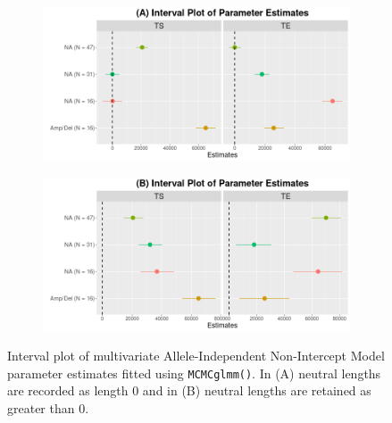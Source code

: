 \begin{figure}[!htb]
\vspace{0.5cm}
     \begin{subfigure}[t]{.49\textwidth}
      \centering
      \includegraphics[width = 1\textwidth]{../figures/Chapter_5/Multivariate_MCMC_6_AI_Interval.png}
    \end{subfigure}%
     \begin{subfigure}[t]{.49\textwidth}
      \centering
       \includegraphics[width = 1\textwidth]{../figures/Chapter_5/Multivariate_MCMC_6_Neut_AI_Interval.png}
    \end{subfigure} 
     \caption[Interval plot of multivariate Allele-Independent Non-Intercept Model parameter estimates fitted using \texttt{MCMCglmm()}.]{Interval plot of multivariate Allele-Independent Non-Intercept Model parameter estimates fitted using \texttt{MCMCglmm()}. In (A) neutral lengths are recorded as length 0 and in (B) neutral lengths are retained as greater than 0.}
\end{figure}

